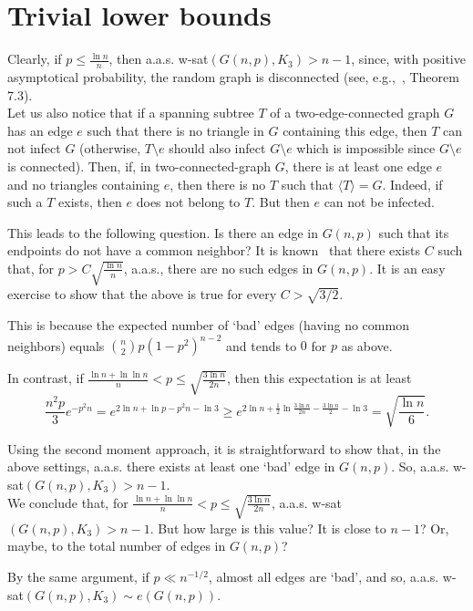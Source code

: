 \documentclass[]{article}
\begin{document}
\section{Trivial lower bounds}
\label{trivial}

Clearly, if $p\leq\frac{\ln n}{n}$, then a.a.s. w-sat$(G(n,p),K_3)>n-1$, since, with positive asymptotical probability, the random graph is disconnected (see, e.g.,~\cite{Bollobas}, Theorem 7.3).\\

Let us also notice that if a spanning subtree $T$ of a two-edge-connected graph $G$ has an edge $e$ such that there is no triangle in $G$ containing this edge, then $T$ can not infect $G$ (otherwise, $T\setminus e$ should also infect $G\setminus e$ which is impossible since $G\setminus e$ is connected).  Then, if, in two-connected-graph $G$, there is at least one edge $e$ and no triangles containing $e$, then there is no $T$ such that $\langle T\rangle = G$. Indeed, if such a $T$ exists, then $e$ does not belong to $T$. But then $e$ can not be infected.

This leads to the following question. Is there an edge in $G(n,p)$ such that its endpoints do not have a common neighbor? It is known~\cite{Spencer_extensions} that there exists $C$ such that, for $p>C\sqrt{\frac{\ln n}{n}}$, a.a.s., there are no such edges in $G(n,p)$. It is an easy exercise to show that the above is true for every $C>\sqrt{3/2}$.

This is because the expected number of `bad' edges (having no common neighbors) equals ${n\choose 2}p(1-p^2)^{n-2}$ and tends to $0$ for $p$ as above. 

In contrast, if $\frac{\ln n+\ln\ln n}{n}<p\leq\sqrt{\frac{3\ln n}{2n}}$, then this expectation is at least 
$$
\frac{n^2p}{3}e^{-p^2n}=e^{2\ln n+\ln p-p^2n-\ln 3}\geq e^{2\ln n+\frac{1}{2}\ln\frac{3\ln n}{2n}-\frac{3\ln n}{2}-\ln 3}=
\sqrt{\frac{\ln n}{6}}.
$$

Using the second moment approach, it is straightforward to show that, in the above settings, a.a.s. there exists at least one `bad' edge in $G(n,p)$. So, a.a.s. w-sat$(G(n,p),K_3)>n-1$.\\

We conclude that, for $\frac{\ln n+\ln\ln n}{n}<p\leq\sqrt{\frac{3\ln n}{2n}}$, a.a.s. w-sat$(G(n,p),K_3)>n-1$. 
But how large is this value? It is close to $n-1$? Or, maybe, to the total number of edges in $G(n,p)$?

By the same argument, if $p\ll n^{-1/2}$, almost all edges are `bad', and so, a.a.s. w-sat$(G(n,p),K_3)\sim e(G(n,p))$. 
\end{document}
